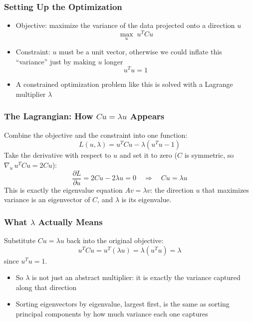 \begin{frame}[fragile] \frametitle{Setting Up the Optimization}
\begin{itemize}
\item Objective: maximize the variance of the data projected onto a direction $u$
\[
\max_{u} \; u^T C u
\]
\item Constraint: $u$ must be a unit vector, otherwise we could inflate this ``variance'' just by making $u$ longer
\[
u^Tu = 1
\]
\item A constrained optimization problem like this is solved with a Lagrange multiplier $\lambda$
\end{itemize}
\end{frame}

\begin{frame}[fragile] \frametitle{The Lagrangian: How $C u = \lambda u$ Appears}
Combine the objective and the constraint into one function:
\[
L(u,\lambda) = u^T C u - \lambda(u^Tu - 1)
\]
Take the derivative with respect to $u$ and set it to zero ($C$ is symmetric, so $\nabla_u\, u^TCu = 2Cu$):
\[
\frac{\partial L}{\partial u} = 2Cu - 2\lambda u = 0
\quad\Rightarrow\quad
Cu = \lambda u
\]
This is exactly the eigenvalue equation $Av=\lambda v$: the direction $u$ that
maximizes variance is an eigenvector of $C$, and $\lambda$ is its eigenvalue.
\end{frame}

\begin{frame}[fragile] \frametitle{What $\lambda$ Actually Means}
Substitute $Cu = \lambda u$ back into the original objective:
\[
u^T C u = u^T(\lambda u) = \lambda (u^Tu) = \lambda
\]
since $u^Tu = 1$.
\begin{itemize}
\item So $\lambda$ is not just an abstract multiplier: it is exactly the variance captured along that direction
\item Sorting eigenvectors by eigenvalue, largest first, is the same as sorting principal components by how much variance each one captures
\end{itemize}
\end{frame}

